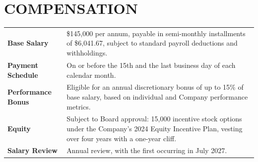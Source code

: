 \section{COMPENSATION}

\noindent
\begin{tabularx}{\linewidth}{@{}>{\color{accent}\bfseries}l@{\hspace{7mm}}V@{}}
Base Salary      & \$145,000 per annum, payable in semi-monthly installments of \$6,041.67, subject to standard payroll deductions and withholdings. \\[3pt]
Payment Schedule & On or before the 15th and the last business day of each calendar month. \\[3pt]
Performance Bonus & Eligible for an annual discretionary bonus of up to 15\% of base salary, based on individual and Company performance metrics. \\[3pt]
Equity           & Subject to Board approval: 15,000 incentive stock options under the Company's 2024 Equity Incentive Plan, vesting over four years with a one-year cliff. \\[3pt]
Salary Review    & Annual review, with the first occurring in July 2027.
\end{tabularx}

